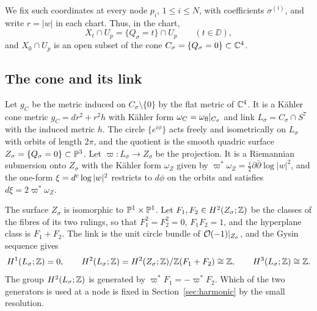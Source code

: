 We fix such coordinates at every node $p_i$, $1\le i\le N$, with coefficients
$\sigma^{(i)}$, and write $r=|w|$ in each chart. Thus, in the chart,
\begin{equation}\label{eq:local-fibres}
 X_t\cap U_p=\{Q_\sigma=t\}\cap U_p\qquad(t\in\DD),
\end{equation}
and $X_0\cap U_p$ is an open subset of the cone
$C_\sigma=\{Q_\sigma=0\}\subset\mathbb C^4$.

\subsection{The cone and its link}
Let $g_C$ be the metric induced on $C_\sigma\setminus\{0\}$ by the flat
metric of $\mathbb C^4$. It is a K\"ahler cone metric $g_C=dr^2+r^2h$ with
K\"ahler form $\omega_C=\omega_{\rm fl}|_{C_\sigma}$ and link
$L_\sigma=C_\sigma\cap S^7$ with the induced metric $h$. The circle
$\{e^{i\phi}\}$ acts freely and isometrically on $L_\sigma$ with orbits of
length $2\pi$, and the quotient is the smooth quadric surface
$Z_\sigma=\{Q_\sigma=0\}\subset\mathbb P^3$. Let $\varpi:L_\sigma\to Z_\sigma$ be the
projection. It is a Riemannian submersion onto $Z_\sigma$ with the
K\"ahler form $\omega_Z$ given by $\varpi^*\omega_Z=\tfrac i2\partial\bar\partial
\log|w|^2$, and the one-form $\xi=d^c\log|w|^2$ restricts to $d\phi$ on
the orbits and satisfies $d\xi=2\varpi^*\omega_Z$.

The surface $Z_\sigma$ is isomorphic to $\mathbb P^1\times\mathbb P^1$. Let $F_1,F_2\in
H^2(Z_\sigma;\mathbb Z)$ be the classes of the fibres of its two rulings, so that
$F_1^2=F_2^2=0$, $F_1F_2=1$, and the hyperplane class is $F_1+F_2$. The link is the
unit circle bundle of $\mathcal O(-1)|_{Z_\sigma}$, and the Gysin sequence gives
\begin{equation}\label{eq:link-cohomology}
 H^1(L_\sigma;\mathbb Z)=0,\qquad
 H^2(L_\sigma;\mathbb Z)=H^2(Z_\sigma;\mathbb Z)/\mathbb Z(F_1+F_2)\cong\mathbb Z,\qquad
 H^3(L_\sigma;\mathbb Z)\cong\mathbb Z .
\end{equation}
The group $H^2(L_\sigma;\mathbb Z)$ is generated by $\varpi^*F_1=-\varpi^*F_2$. Which of the
two generators is used at a node is fixed in Section~\ref{sec:harmonic}
by the small resolution.

